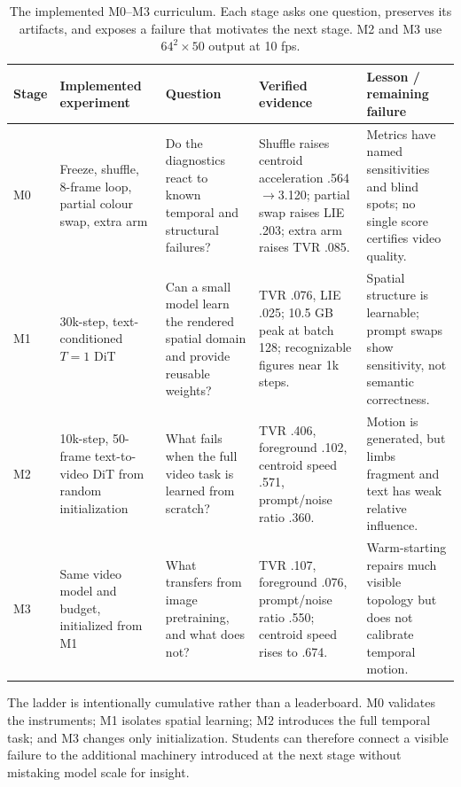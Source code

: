 \documentclass[10pt,twocolumn]{article}
\begin{document}
\begin{table}[t]\centering
\caption{The implemented M0--M3 curriculum. Each stage asks one question, preserves its artifacts, and exposes a
failure that motivates the next stage. M2 and M3 use $64^2\!\times\!50$ output at 10 fps.}
\label{tab:ladder}\scriptsize
\setlength{\tabcolsep}{3.5pt}
\begin{tabular}{@{}>{\raggedright\arraybackslash}p{}>{\raggedright\arraybackslash}p{}>{\raggedright\arraybackslash}p{}>{\raggedright\arraybackslash}p{}>{\raggedright\arraybackslash}p{}@{}}\toprule
Stage & Implemented experiment & Question & Verified evidence & Lesson / remaining failure \\\midrule
M0 & Freeze, shuffle, 8-frame loop, partial colour swap, extra arm & Do the diagnostics react to known temporal and structural failures? & Shuffle raises centroid acceleration .564$\rightarrow$3.120; partial swap raises LIE .203; extra arm raises TVR .085. & Metrics have named sensitivities and blind spots; no single score certifies video quality. \\
M1 & 30k-step, text-conditioned $T{=}1$ DiT & Can a small model learn the rendered spatial domain and provide reusable weights? & TVR .076, LIE .025; 10.5 GB peak at batch 128; recognizable figures near 1k steps. & Spatial structure is learnable; prompt swaps show sensitivity, not semantic correctness. \\
M2 & 10k-step, 50-frame text-to-video DiT from random initialization & What fails when the full video task is learned from scratch? & TVR .406, foreground .102, centroid speed .571, prompt/noise ratio .360. & Motion is generated, but limbs fragment and text has weak relative influence. \\
M3 & Same video model and budget, initialized from M1 & What transfers from image pretraining, and what does not? & TVR .107, foreground .076, prompt/noise ratio .550; centroid speed rises to .674. & Warm-starting repairs much visible topology but does not calibrate temporal motion. \\\bottomrule
\end{tabular}
\end{table}

The ladder is intentionally cumulative rather than a leaderboard. M0 validates the instruments; M1 isolates spatial
learning; M2 introduces the full temporal task; and M3 changes only initialization. Students can therefore connect a
visible failure to the additional machinery introduced at the next stage without mistaking model scale for insight.
\end{document}
